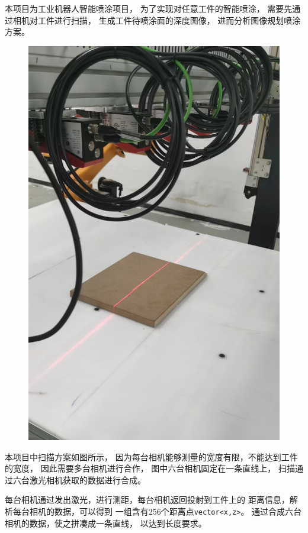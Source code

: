 \documentclass{article}
\begin{document}
本项目为工业机器人智能喷涂项目，
为了实现对任意工件的智能喷涂，
需要先通过相机对工件进行扫描，
生成工件待喷涂面的深度图像，
进而分析图像规划喷涂方案。
\begin{figure}[H]
    \centering
    \includegraphics[width=\textwidth/2]{相关资源/图片/题目5扫描设备.jpg}  
\end{figure}
本项目中扫描方案如图所示，
因为每台相机能够测量的宽度有限，不能达到工件的宽度，
因此需要多台相机进行合作，
图中六台相机固定在一条直线上，
扫描通过六台激光相机获取的数据进行合成。 

每台相机通过发出激光，进行测距，每台相机返回投射到工件上的
距离信息，解析每台相机的数据，可以得到
一组含有256个距离点\verb|vector<x,z>|。
通过合成六台相机的数据，使之拼凑成一条直线，
以达到长度要求。
\end{document}
